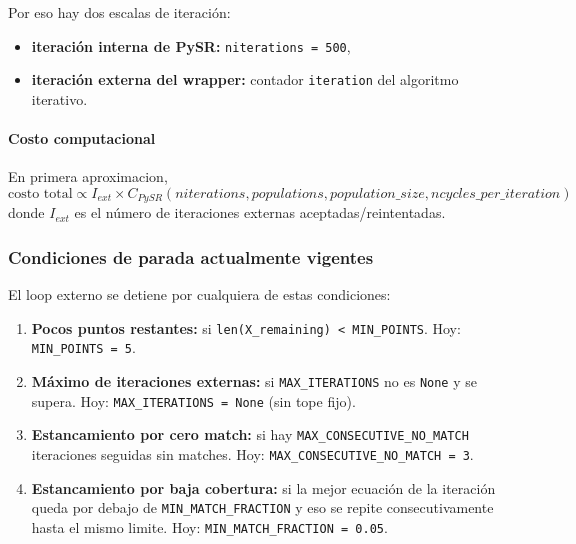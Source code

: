 \documentclass[12pt]{article}
\begin{document}
Por eso hay dos escalas de iteración:
\begin{itemize}[leftmargin=1.5em]
    \item \textbf{iteración interna de PySR:} \texttt{niterations = 500},
    \item \textbf{iteración externa del wrapper:} contador \texttt{iteration} del algoritmo iterativo.
\end{itemize}

\paragraph{Costo computacional}
En primera aproximacion,
\[
\text{costo total} \propto I_{ext} \times C_{PySR}(niterations, populations, population\_size, ncycles\_per\_iteration)
\]
donde $I_{ext}$ es el número de iteraciones externas aceptadas/reintentadas.

\subsubsection*{Condiciones de parada actualmente vigentes}
El loop externo se detiene por cualquiera de estas condiciones:

\begin{enumerate}[leftmargin=1.5em]
    \item \textbf{Pocos puntos restantes:} si \texttt{len(X\_remaining) < MIN\_POINTS}.
    Hoy: \texttt{MIN\_POINTS = 5}.
    \item \textbf{Máximo de iteraciones externas:} si \texttt{MAX\_ITERATIONS} no es \texttt{None} y se supera.
    Hoy: \texttt{MAX\_ITERATIONS = None} (sin tope fijo).
    \item \textbf{Estancamiento por cero match:} si hay \texttt{MAX\_CONSECUTIVE\_NO\_MATCH} iteraciones seguidas sin matches.
    Hoy: \texttt{MAX\_CONSECUTIVE\_NO\_MATCH = 3}.
    \item \textbf{Estancamiento por baja cobertura:} si la mejor ecuación de la iteración queda por debajo de
    \texttt{MIN\_MATCH\_FRACTION} y eso se repite consecutivamente hasta el mismo limite.
    Hoy: \texttt{MIN\_MATCH\_FRACTION = 0.05}.
\end{enumerate}
\end{document}

